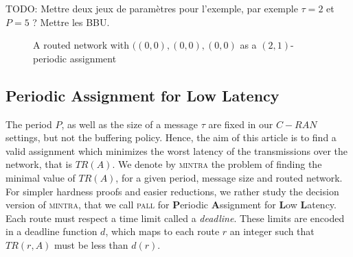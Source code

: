 \documentclass[a4paper,10pt]{article}
\newcommand{\todo}[1]{{\color{red} TODO: {#1}}}
\newcommand\pall{\textsc{pall}\xspace}
\newcommand\mintra{\textsc{mintra}\xspace}
\begin{document}
\todo{Mettre deux jeux de paramètres pour l'exemple, par exemple $\tau = 2$ et $P = 5$ ? Mettre les BBU.}

  
\begin{figure}[ht]
    \begin{center}
  	\end{center}
    \caption{A routed network with $((0,0),(0,0),(0,0)$ as a $(2,1)$-periodic assignment}
    \label{fig:example}
\end{figure}



	\subsection{Periodic Assignment for Low Latency}

      	The period $P$, as well as the size of a message $\tau$ are fixed in our $C-RAN$ settings, but not the buffering policy. Hence, the aim of this article is to find a valid assignment which minimizes the worst latency of the transmissions over the network, that is $TR(A)$. We denote by \mintra the problem of finding the minimal value of $TR(A)$, for a given period, message size and routed network.
      	For simpler hardness proofs and easier reductions, we rather study the decision version of \mintra, that we call \pall for \textbf{P}eriodic \textbf{A}ssignment for \textbf{L}ow \textbf{L}atency. Each route must respect a time limit called a \emph{deadline}. These limits are encoded in a deadline function $d$, which maps to each route $r$ an integer such that $TR(r,A)$ must be less than $d(r)$.
       
\end{document}

